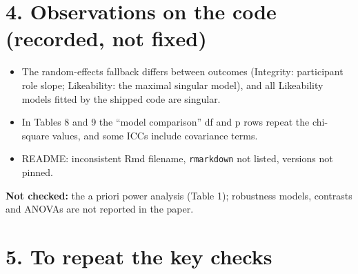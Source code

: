 \documentclass[
]{article}
\providecommand{\tightlist}{%
  \setlength{\itemsep}{0pt}\setlength{\parskip}{0pt}}
\begin{document}
\section{4. Observations on the code (recorded, not
fixed)}\label{observations-on-the-code-recorded-not-fixed}

\begin{itemize}
\tightlist
\item
  The random-effects fallback differs between outcomes (Integrity:
  participant role slope; Likeability: the maximal singular model), and
  all Likeability models fitted by the shipped code are singular.
\item
  In Tables 8 and 9 the ``model comparison'' df and p rows repeat the
  chi-square values, and some ICCs include covariance terms.
\item
  README: inconsistent Rmd filename, \texttt{rmarkdown} not listed,
  versions not pinned.
\end{itemize}

\textbf{Not checked:} the a priori power analysis (Table 1); robustness
models, contrasts and ANOVAs are not reported in the paper.

\section{5. To repeat the key checks}\label{to-repeat-the-key-checks}
\end{document}
